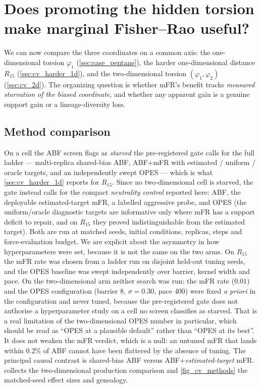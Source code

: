 \section{Does promoting the hidden torsion make marginal Fisher--Rao useful?}
\label{sec:cv_does_it_help}

We can now compare the three coordinates on a common axis: the one-dimensional torsion
$\varphi_1$ (\cref{sec:case_pentane}), the harder one-dimensional distance $R_{15}$
(\cref{sec:cv_harder_1d}), and the two-dimensional torsion $(\varphi_1,\varphi_2)$
(\cref{sec:cv_2d}). The organizing question is whether mFR's benefit tracks \emph{measured
starvation of the biased coordinate}, and whether any apparent gain is a genuine
support gain or a lineage-diversity loss.

\subsection{Method comparison}
On a cell the ABF screen flags as \emph{starved} the pre-registered gate calls for the full
ladder --- multi-replica shared-bias ABF, ABF+mFR with estimated / uniform / oracle targets,
and an independently swept OPES --- which is what \cref{sec:cv_harder_1d} reports for
$R_{15}$. Since no two-dimensional cell is starved, the gate instead calls for the compact
\emph{neutrality control} reported here: ABF, the deployable estimated-target mFR, a labelled
aggressive probe, and OPES (the uniform/oracle diagnostic targets are informative only where
mFR has a support deficit to repair, and on $R_{15}$ they proved indistinguishable from the
estimated target). Both are run at matched seeds, initial conditions, replicas, steps and
force-evaluation budget. We are explicit about the asymmetry in how hyperparameters were set,
because it is not the same on the two arms. On $R_{15}$ the mFR rate was chosen from a ladder
run on disjoint held-out tuning seeds, and the OPES baseline was swept independently over
barrier, kernel width and pace. On the two-dimensional arm neither search was run: the mFR
rate ($0.01$) and the OPES configuration (barrier $8$, $\sigma=0.30$, pace $400$) were fixed
\emph{a priori} in the configuration and never tuned, because the pre-registered gate does not
authorise a hyperparameter study on a cell no screen classifies as starved. That is a real
limitation of the two-dimensional OPES number in particular, which should be read as ``OPES at
a plausible default'' rather than ``OPES at its best''. It does not weaken the mFR verdict,
which is a null: an untuned mFR that lands within $0.2\%$ of ABF cannot have been flattered by
the absence of tuning. The principal causal contrast is shared-bias ABF versus
ABF+\emph{estimated-target} mFR.  collects the
two-dimensional production comparison and \cref{fig_cv_methods} the matched-seed effect sizes
and genealogy.


